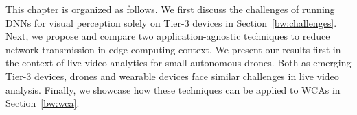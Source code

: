 This chapter is organized as follows. We first discuss the challenges of running
DNNs for visual perception solely on Tier-3 devices in
Section~\ref{bw:challenges}. Next, we propose and compare two
application-agnostic techniques to reduce network transmission in edge computing
context. We present our results first in the context of live video analytics for
small autonomous drones. Both as emerging Tier-3 devices, drones and wearable
devices face similar challenges in live video analysis. Finally, we showcase how
these techniques can be applied to WCAs in Section~\ref{bw:wca}.





